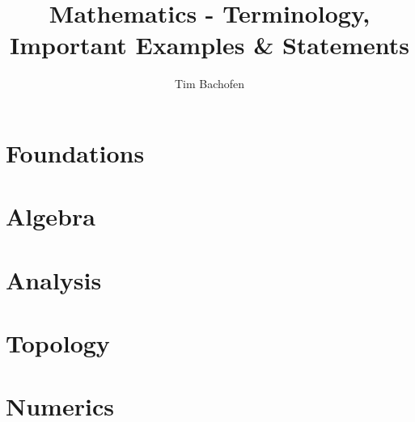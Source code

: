 \documentclass{book}
\begin{document}
   \title{Mathematics - Terminology, Important Examples \& Statements}
   \author{Tim Bachofen}

   \maketitle

   \tableofcontents
   \newpage

   \part{Foundations}
   

   \newpage

   \part{Algebra}
   

   \newpage

   \part{Analysis}
   

   \newpage

   \part{Topology}
   

   \newpage

   \part{Numerics}
   

   \newpage

   \printglossaries{}
\end{document}
